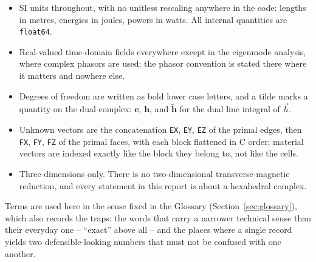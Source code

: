 \begin{itemize}[leftmargin=1.4em,itemsep=2pt]
  \item SI units throughout, with no unitless rescaling anywhere in the code: lengths in metres, energies in
        joules, powers in watts. All internal quantities are \texttt{float64}.
  \item Real-valued time-domain fields everywhere except in the eigenmode analysis, where complex phasors are used; the phasor convention is stated there where it
        matters and nowhere else.
  \item Degrees of freedom are written as bold lower case letters, and a tilde marks a quantity on the dual
        complex: $\mathbf{e}$, $\mathbf{h}$, and $\tilde{\mathbf{h}}$ for the dual line integral of $\vec h$.
  \item Unknown vectors are the concatenation \texttt{EX}, \texttt{EY}, \texttt{EZ} of the primal edges, then
        \texttt{FX}, \texttt{FY}, \texttt{FZ} of the primal faces, with each block flattened in C order; material
        vectors are indexed exactly like the block they belong to, not like the cells.
  \item Three dimensions only. There is no two-dimensional transverse-magnetic reduction, and every statement in
        this report is about a hexahedral complex.
\end{itemize}

\noindent Terms are used here in the sense fixed in the Glossary (Section~\ref{sec:glossary}), which also records the
traps: the words that carry a narrower technical sense than their everyday one -- ``exact'' above all -- and the
places where a single record yields two defensible-looking numbers that must not be confused with one another.

